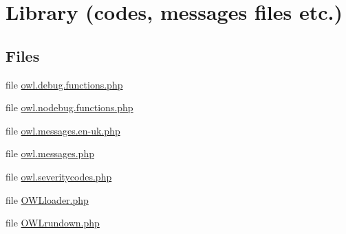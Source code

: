 \section{Library (codes, messages files etc.)}
\label{group__OWL__LIBRARY}
\subsection*{Files}
\begin{DoxyCompactItemize}
\item 
file \hyperlink{owl_8debug_8functions_8php}{owl.debug.functions.php}
\item 
file \hyperlink{owl_8nodebug_8functions_8php}{owl.nodebug.functions.php}
\item 
file \hyperlink{owl_8messages_8en-uk_8php}{owl.messages.en-\/uk.php}
\item 
file \hyperlink{owl_8messages_8php}{owl.messages.php}
\item 
file \hyperlink{owl_8severitycodes_8php}{owl.severitycodes.php}
\item 
file \hyperlink{OWLloader_8php}{OWLloader.php}
\item 
file \hyperlink{OWLrundown_8php}{OWLrundown.php}
\end{DoxyCompactItemize}
